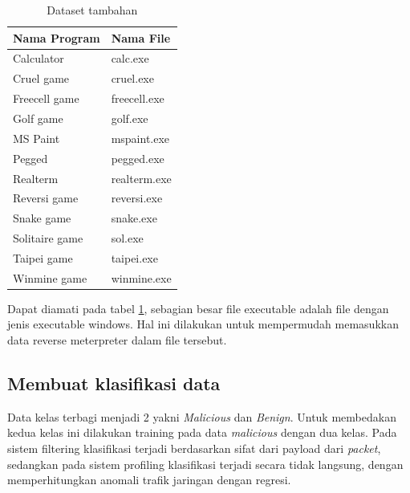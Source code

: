 \documentclass[./skripsi.tex]{subfiles}
\begin{document}
\begin{table}%
\centering
\begin{tabularx}{0.5\textwidth}{|l|X|}
\hline
\textbf{Nama Program} & \textbf{Nama File} \\
\hline
Calculator & calc.exe\\
\hline
Cruel game & cruel.exe\\
\hline
Freecell game & freecell.exe\\
\hline
Golf game & golf.exe\\
\hline
MS Paint & mspaint.exe\\
\hline
Pegged & pegged.exe\\
\hline
Realterm & realterm.exe\\
\hline
Reversi game & reversi.exe\\
\hline
Snake game & snake.exe\\
\hline
Solitaire game & sol.exe\\
\hline
Taipei game & taipei.exe\\
\hline
Winmine game & winmine.exe\\
\hline
\end{tabularx}
\caption{Dataset tambahan}
\label{table:dataset_tambahan}
\end{table}
\par Dapat diamati pada tabel \ref{table:dataset_tambahan}, sebagian besar file executable adalah file dengan jenis executable windows. Hal ini dilakukan untuk mempermudah memasukkan data reverse meterpreter dalam file tersebut.
\subsection{Membuat klasifikasi data}
\par Data kelas terbagi menjadi 2 yakni \textit{Malicious} dan \textit{Benign}. Untuk membedakan kedua kelas ini dilakukan training pada data \textit{malicious} dengan dua kelas. Pada sistem filtering klasifikasi terjadi berdasarkan sifat dari payload dari \textit{packet}, sedangkan pada sistem profiling klasifikasi terjadi secara tidak langsung, dengan memperhitungkan anomali trafik jaringan dengan regresi.
\end{document}
